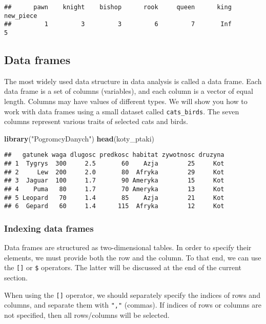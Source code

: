 \documentclass[]{book}
\newenvironment{Shaded}{\begin{snugshade}}{\end{snugshade}}
\newcommand{\KeywordTok}[1]{\textcolor[rgb]{0.13,0.29,0.53}{\textbf{#1}}}
\newcommand{\StringTok}[1]{\textcolor[rgb]{0.31,0.60,0.02}{#1}}
\newcommand{\NormalTok}[1]{#1}
\theoremstyle{definition}
\theoremstyle{definition}
\theoremstyle{definition}
\theoremstyle{remark}
\begin{document}
\begin{verbatim}
##      pawn    knight    bishop      rook     queen      king new_piece 
##         1         3         3         6         7       Inf         5
\end{verbatim}

\subsection{Data frames}\label{part_222}

The most widely used data structure in data analysis is called a data
frame. Each data frame is a set of columns (variables), and each column
is a vector of equal length. Columns may have values of different types.
We will show you how to work with data frames using a small dataset
called \texttt{cats\_birds}. The seven columns represent various traits
of selected cats and birds.

\begin{Shaded}
\begin{Highlighting}[]
\KeywordTok{library}\NormalTok{(}\StringTok{"PogromcyDanych"}\NormalTok{)}
\KeywordTok{head}\NormalTok{(koty_ptaki)}
\end{Highlighting}
\end{Shaded}

\begin{verbatim}
##   gatunek waga dlugosc predkosc habitat zywotnosc druzyna
## 1  Tygrys  300     2.5       60    Azja        25     Kot
## 2     Lew  200     2.0       80  Afryka        29     Kot
## 3  Jaguar  100     1.7       90 Ameryka        15     Kot
## 4    Puma   80     1.7       70 Ameryka        13     Kot
## 5 Leopard   70     1.4       85    Azja        21     Kot
## 6  Gepard   60     1.4      115  Afryka        12     Kot
\end{verbatim}

\subsubsection{Indexing data frames}\label{part_2221}

Data frames are structured as two-dimensional tables. In order to
specify their elements, we must provide both the row and the column. To
that end, we can use the \texttt{{[}{]}} or \texttt{\$} operators. The
latter will be discussed at the end of the current section.

When using the \texttt{{[}{]}} operator, we should separately specify
the indices of rows and columns, and separate them with \texttt{","}
(commas). If indices of rows or columns are not specified, then all
rows/columns will be selected.
\end{document}
